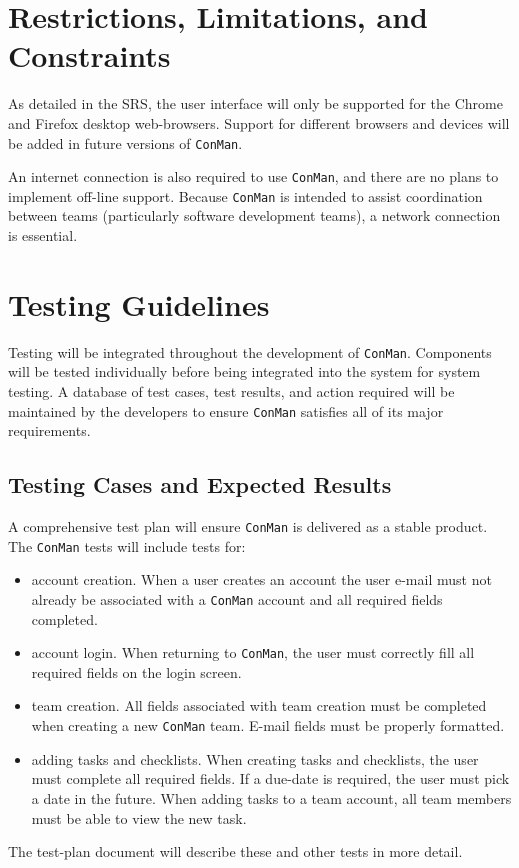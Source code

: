 \documentclass{article}
\begin{document}
\newpage
\section{Restrictions, Limitations, and Constraints}
As detailed in the SRS, the user interface will only be supported for the Chrome and Firefox desktop web-browsers.
Support for different browsers and devices will be added in future versions of \texttt{ConMan}.

An internet connection is also required to use \texttt{ConMan}, and there are no plans to implement off-line support.
Because \texttt{ConMan} is intended to assist coordination between teams (particularly software development teams), a network connection is essential.
\newpage
\section{Testing Guidelines}
Testing will be integrated throughout the development of \texttt{ConMan}.  Components will be tested individually before being integrated into the system for system testing.
A database of test cases, test results, and action required will be maintained by the developers to ensure \texttt{ConMan} satisfies all of its major requirements.

\subsection{Testing Cases and Expected Results}
A comprehensive test plan will ensure \texttt{ConMan} is delivered as a stable product. 
The \texttt{ConMan} tests will include tests for:
\begin{itemize}
\item account creation.  When a user creates an account the user e-mail must not already be associated with a \texttt{ConMan} account and all required fields completed.
\item account login.  When returning to \texttt{ConMan}, the user must correctly fill all required fields on the login screen.
\item team creation.  All fields associated with team creation must be completed when creating a new \texttt{ConMan} team.  E-mail fields must be properly formatted.
\item adding tasks and checklists.  When creating tasks and checklists, the user must complete all required fields.  If a due-date is required, the user must pick a date in the future.  When adding tasks to a team account, all team members must be able to view the new task.
\end{itemize}
The test-plan document will describe these and other tests in more detail.  
\end{document}
